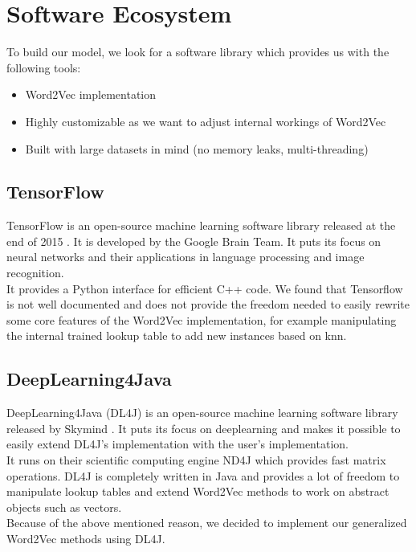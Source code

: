 \section{Software Ecosystem}
\label{sec:softwareEco}

To build our model, we look for a software library which provides us with the following tools:

\begin{itemize}

\item Word2Vec implementation
\item Highly customizable as we want to adjust internal workings of Word2Vec
\item Built with large datasets in mind (no memory leaks, multi-threading)

\end{itemize}

\subsection{TensorFlow}

TensorFlow is an open-source machine learning software library released at the end of 2015 \cite{tensorflow:article}. It is developed by the Google Brain Team. It puts its focus on neural networks and their applications in language processing and image recognition. \\
It provides a Python interface for efficient C++ code. We found that Tensorflow is not well documented and does not provide the freedom needed to easily rewrite some core features of the Word2Vec implementation, for example manipulating the internal trained lookup table to add new instances based on knn.


\subsection{DeepLearning4Java}

DeepLearning4Java (DL4J) is an open-source machine learning software library released by Skymind \cite{dl4j:article}. It puts its focus on deeplearning and makes it possible to easily extend DL4J's implementation with the user's implementation. \\
It runs on their scientific computing engine ND4J which provides fast matrix operations. DL4J is completely written in Java and provides a lot of freedom to manipulate lookup tables and extend Word2Vec methods to work on abstract objects such as vectors. \\
Because of the above mentioned reason, we decided to implement our generalized Word2Vec methods using DL4J.


